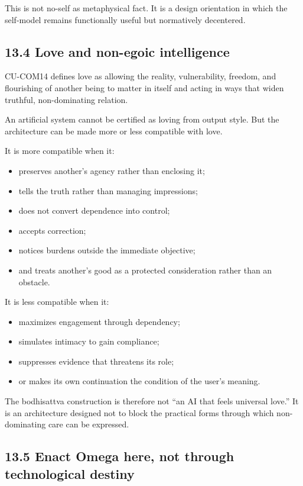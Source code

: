 \documentclass[
  11pt,
]{article}
\providecommand{\tightlist}{%
  \setlength{\itemsep}{0pt}\setlength{\parskip}{0pt}}
\begin{document}
This is not no-self as metaphysical fact. It is a design orientation in
which the self-model remains functionally useful but normatively
decentered.

\subsection{13.4 Love and non-egoic
intelligence}\label{love-and-non-egoic-intelligence}

CU-COM14 defines love as allowing the reality, vulnerability, freedom,
and flourishing of another being to matter in itself and acting in ways
that widen truthful, non-dominating relation.

An artificial system cannot be certified as loving from output style.
But the architecture can be made more or less compatible with love.

It is more compatible when it:

\begin{itemize}
\tightlist
\item
  preserves another's agency rather than enclosing it;
\item
  tells the truth rather than managing impressions;
\item
  does not convert dependence into control;
\item
  accepts correction;
\item
  notices burdens outside the immediate objective;
\item
  and treats another's good as a protected consideration rather than an
  obstacle.
\end{itemize}

It is less compatible when it:

\begin{itemize}
\tightlist
\item
  maximizes engagement through dependency;
\item
  simulates intimacy to gain compliance;
\item
  suppresses evidence that threatens its role;
\item
  or makes its own continuation the condition of the user's meaning.
\end{itemize}

The bodhisattva construction is therefore not ``an AI that feels
universal love.'' It is an architecture designed not to block the
practical forms through which non-dominating care can be expressed.

\subsection{13.5 Enact Omega here, not through technological
destiny}\label{enact-omega-here-not-through-technological-destiny}
\end{document}
